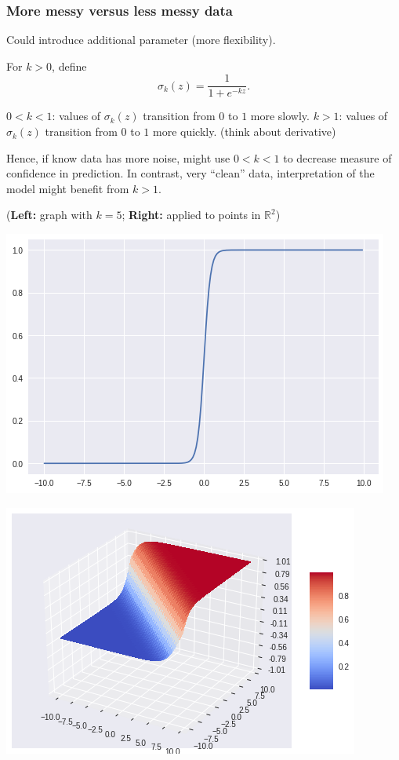 \documentclass{beamer}
\theoremstyle{example}
\begin{document}
\begin{frame}
    \frametitle{More messy versus less messy data}
    Could introduce additional parameter (more flexibility).

    For $k > 0$, define \[\sigma_k(z) = \frac{1}{1+e^{-kz}}.\]

    $0 < k < 1$: values of $\sigma_k(z)$ transition from $0$ to $1$ more slowly.\newline 
    $k > 1$: values of $\sigma_k(z)$ transition from $0$ to $1$ more quickly. (think about derivative)

    Hence, if know data has more noise, might use $0 < k < 1$ to decrease measure of confidence in prediction. In contrast, very ``clean'' data, interpretation of the model might benefit from $k>1$.
    
    (\textbf{Left:} graph with $k=5$; \textbf{Right:} applied to points in $\mathbb R^2$)
    \centering
    \begin{multicols}{2}
    \includegraphics[height=0.25\textheight]{../../Images/logistic_function_kis5.png}

    \includegraphics[height=0.25\textheight]{../../Images/logistic_function_appliedtohalfspace.png}
    \end{multicols}
    
\end{frame}
\end{document}
